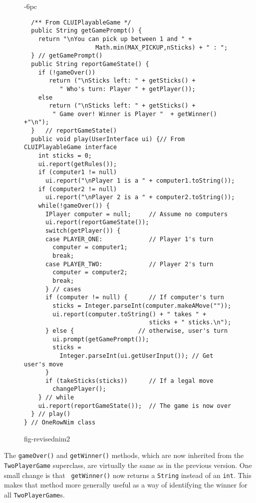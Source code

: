\begin{figure}[h!]
\jjjprogstart
\begin{jjjlistingleft}[32pc]{-6pc}
\begin{lstlisting}
  /** From CLUIPlayableGame */
  public String getGamePrompt() {
    return "\nYou can pick up between 1 and " + 
                    Math.min(MAX_PICKUP,nSticks) + " : ";
  } // getGamePrompt()
  public String reportGameState() {   
    if (!gameOver())
       return ("\nSticks left: " + getSticks() + 
          " Who's turn: Player " + getPlayer());
    else
       return ("\nSticks left: " + getSticks() + 
        " Game over! Winner is Player "  + getWinner() +"\n");
  }   // reportGameState()
  public void play(UserInterface ui) {// From CLUIPlayableGame interface
    int sticks = 0;
    ui.report(getRules());
    if (computer1 != null) 
      ui.report("\nPlayer 1 is a " + computer1.toString());
    if (computer2 != null)
      ui.report("\nPlayer 2 is a " + computer2.toString());
    while(!gameOver()) {  
      IPlayer computer = null;     // Assume no computers
      ui.report(reportGameState());
      switch(getPlayer()) {
      case PLAYER_ONE:             // Player 1's turn
        computer = computer1;
        break;
      case PLAYER_TWO:             // Player 2's turn
        computer = computer2;
        break;
      } // cases
      if (computer != null) {      // If computer's turn
        sticks = Integer.parseInt(computer.makeAMove(""));
        ui.report(computer.toString() + " takes " + 
                                   sticks + " sticks.\n");
      } else {                  // otherwise, user's turn
        ui.prompt(getGamePrompt());
        sticks = 
          Integer.parseInt(ui.getUserInput()); // Get user's move 
      }
      if (takeSticks(sticks))      // If a legal move
        changePlayer();
    } // while
    ui.report(reportGameState());  // The game is now over
  } // play()
} // OneRowNim class
\end{lstlisting}
\end{jjjlistingleft}
{fig-revisednim2}
\end{figure}

The {\tt gameOver()} and {\tt getWinner()} methods, which are now
inherited from the {\tt TwoPlayerGame} superclass, are virtually the
same as in the previous version. One small change is that {\tt
getWinner()} now returns a {\tt String} instead of an {\tt int}.  This
makes that method more generally useful as a way of identifying the
winner for all {\tt TwoPlayerGame}s.  

